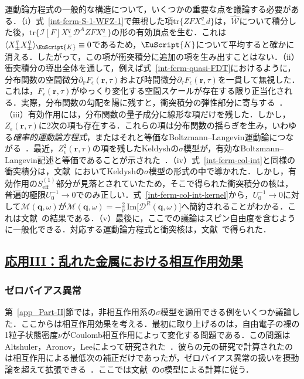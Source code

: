 \documentclass[a4paper,11pt]{ltjsarticle}
\newcommand{\subsectionlink}[1]{\subsection[#1]{\hyperlink{toc}{#1}}}
\def\tr{\mathrm{tr}}
\def\qo{(\mathbf{q},\omega)}
\begin{document}
運動論方程式の一般的な構造について，いくつかの重要な点を議論する必要がある．（i）式~\eqref{int-ferm-S-1-WFZ-1}で無視した項$\tr\{ZFX^{q}_{-}d\}$は，$\hat{\mathcal{W}}$について積分した後，$\tr\big\{\mathcal{I}[F]X^{q}_{+}\mathcal{D}^{A}ZFX^{q}_{-}\big\}$の形の有効頂点を生む．これは$\langle
X^{q}_{\pm}X^{q}_{\pm}\rangle_{\EuScript{K}}\equiv0$であるため，$\EuScript{K}$について平均すると確かに消える．したがって，この項が衝突積分に追加の項を生み出すことはない．（ii）衝突積分の導出全体を通して，例えば式~\eqref{int-ferm-quasi-FDT}におけるように，分布関数の空間微分$\partial_{\mathbf{r}}
F_{\epsilon}(\mathbf{r},\tau)$および時間微分$\partial_{\tau}F_{\epsilon}(\mathbf{r},\tau)$を一貫して無視した．これは，$F_{\epsilon}(\mathbf{r},\tau)$がゆっくり変化する空間スケールが存在する限り正当化される．実際，分布関数の勾配を陽に残すと，衝突積分の弾性部分に寄与する~\cite{Zala,CatelaniAleiner}．（iii）有効作用には，分布関数の量子成分に線形な項だけを残した．しかし，$Z_{\epsilon}(\mathbf{r},\tau)$に2次の項も存在する．これらの項は分布関数の揺らぎを生み，いわゆる\textit{確率的運動論方程式}，またはそれと等価なBoltzmann--Langevin運動論につながる~\cite{Kogan,KoganShulman,Nagaev}．最近，$Z^{2}_{\epsilon}(\mathbf{r},\tau)$の項を残したKeldyshの$\sigma$模型が，有効なBoltzmann--Langevin記述と等価であることが示された~\cite{Gutman,Bagrets}．（iv）式~\eqref{int-ferm-col-int}と同様の衝突積分は，文献~\cite{Kamenev:1999zza}においてKeldyshの$\sigma$模型の形式の中で導かれた．しかし，有効作用の$S^{(1)}_{\mathrm{eff}}$部分が見落とされていたため，そこで得られた衝突積分の核は，普遍的極限$U^{-1}_{0}\to0$でのみ正しい．式~\eqref{int-ferm-col-int-kernel}から，$U^{-1}_{0}\to0$に対して$\mathcal{M}\qo$が$\mathcal{M}\qo=-\frac{2}{\nu}\,\mathrm{Im}\big[\mathcal{D}^{R}\qo\big]$へ簡約されることがわかる．これは文献~\cite{Kamenev:1999zza}の結果である．（v）最後に，ここでの議論はスピン自由度を含むように一般化できる．対応する運動論方程式と衝突核は，文献~\cite{DimitrovaKtavtsov,BurmiChelk}で得られた．

\subsectionlink{応用III：乱れた金属における相互作用効果}\label{app_Part-III}
\subsubsection{ゼロバイアス異常}\label{app_Part-III-1}

第~\ref{app_Part-II}節では，非相互作用系の$\sigma$模型を適用できる例をいくつか議論した．ここからは相互作用効果を考える．最初に取り上げるのは，自由電子の裸の1粒子状態密度$\nu$がCoulomb相互作用によって変化する問題である．この問題はAltshuler，Aronov，Leeによって研究された~\cite{AltshulerAronov,AAL,AltshulerAronov-review}．彼らの元の研究で計算されたのは相互作用による最低次の補正だけであったが，ゼロバイアス異常の扱いを摂動論を超えて拡張できる~\cite{Finkel'stein,Nazarov-ZBA,LevitovShytov,Kopietz}．ここでは文献~\cite{Kamenev:1999zza}のσ模型による計算に従う．
\end{document}
